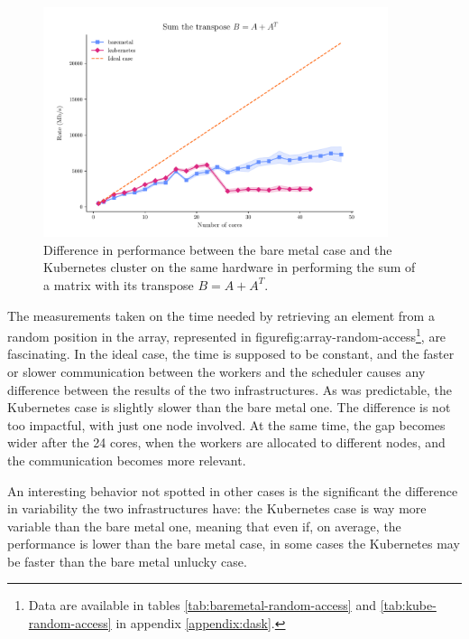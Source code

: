 \begin{figure}
  \centering
  \includegraphics[width=0.9\textwidth]{img/chpt4/array-sum-the-transpose}
  \caption{Difference in performance between the bare metal case and the
    Kubernetes cluster on the same hardware in performing the sum of a matrix
    with its transpose $B=A+A^T$.}
  \label{fig:array-sum-transposed-matrix}
\end{figure}

The measurements taken on the time needed by retrieving an element from a random
position in the array, represented in figure{fig:array-random-access}\footnote{
  Data are available in tables \ref{tab:baremetal-random-access} and
  \ref{tab:kube-random-access} in appendix \ref{appendix:dask}.
}, are fascinating.
In the ideal case, the time is supposed to be constant, and the faster or slower
communication between the workers and the scheduler causes any difference
between the results of the two infrastructures. As was predictable, the
Kubernetes case is slightly slower than the bare metal one.
The difference is not too impactful, with just one node involved. At the same
time, the gap becomes wider after the 24 cores, when the workers are allocated
to different nodes, and the communication becomes more relevant.

An interesting behavior not spotted in other cases is the significant the
difference in variability the two infrastructures have: the Kubernetes case is
way more variable than the bare metal one, meaning that even if, on average, the
performance is lower than the bare metal case, in some cases the Kubernetes may
be faster than the bare metal unlucky case.

